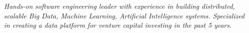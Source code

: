 \begin{cvparagraph}

  \vspace{4mm}
  \emph{Hands-on software engineering leader with experience in building distributed, scalable Big Data, Machine Learning, Artificial Intelligence systems.
    Specialized in creating a data platform for venture capital investing in the past 5 years.}
\end{cvparagraph}
